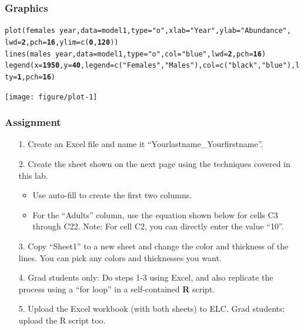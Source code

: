 \documentclass[color=usenames,dvipsnames]{beamer}\usepackage[]{graphicx}\usepackage[]{color}
\makeatletter
\newcommand{\hlnum}[1]{\textcolor[rgb]{0.502,0,0.502}{\textbf{#1}}}%
\newcommand{\hlstr}[1]{\textcolor[rgb]{0.651,0.522,0}{#1}}%
\newcommand{\hlopt}[1]{\textcolor[rgb]{1,0,0.502}{\textbf{#1}}}%
\newcommand{\hlstd}[1]{\textcolor[rgb]{0,0,0}{#1}}%
\newcommand{\hlkwc}[1]{\textcolor[rgb]{0,0.502,0.753}{#1}}%
\newcommand{\hlkwd}[1]{\textcolor[rgb]{0,0.267,0.4}{#1}}%
\newenvironment{kframe}{%
 \def\at@end@of@kframe{}%
 \ifinner\ifhmode%
  \def\at@end@of@kframe{\end{minipage}}%
  \begin{minipage}{\columnwidth}%
 \fi\fi%
 \def\FrameCommand##1{\hskip\@totalleftmargin \hskip-\fboxsep
 \colorbox{shadecolor}{##1}\hskip-\fboxsep
     \hskip-\linewidth \hskip-\@totalleftmargin \hskip\columnwidth}%
 \MakeFramed {\advance\hsize-\width
   \@totalleftmargin\z@ \linewidth\hsize
   \@setminipage}}%
 {\par\unskip\endMakeFramed%
 \at@end@of@kframe}
\newenvironment{knitrout}{}{} %
\makeatother
\begin{document}
\begin{frame}[fragile]
  \frametitle{Graphics}
\begin{knitrout}\tiny
{}\color{fgcolor}\begin{kframe}
\begin{alltt}
\hlkwd{plot}\hlstd{(females} \hlopt{~} \hlstd{year,} \hlkwc{data}\hlstd{=model1,} \hlkwc{type}\hlstd{=}\hlstr{"o"}\hlstd{,} \hlkwc{xlab}\hlstd{=}\hlstr{"Year"}\hlstd{,} \hlkwc{ylab}\hlstd{=}\hlstr{"Abundance"}\hlstd{,}
     \hlkwc{lwd}\hlstd{=}\hlnum{2}\hlstd{,} \hlkwc{pch}\hlstd{=}\hlnum{16}\hlstd{,} \hlkwc{ylim}\hlstd{=}\hlkwd{c}\hlstd{(}\hlnum{0}\hlstd{,} \hlnum{120}\hlstd{))}
\hlkwd{lines}\hlstd{(males} \hlopt{~} \hlstd{year,} \hlkwc{data}\hlstd{=model1,} \hlkwc{type}\hlstd{=}\hlstr{"o"}\hlstd{,} \hlkwc{col}\hlstd{=}\hlstr{"blue"}\hlstd{,} \hlkwc{lwd}\hlstd{=}\hlnum{2}\hlstd{,} \hlkwc{pch}\hlstd{=}\hlnum{16}\hlstd{)}
\hlkwd{legend}\hlstd{(}\hlkwc{x}\hlstd{=}\hlnum{1950}\hlstd{,} \hlkwc{y}\hlstd{=}\hlnum{40}\hlstd{,} \hlkwc{legend}\hlstd{=}\hlkwd{c}\hlstd{(}\hlstr{"Females"}\hlstd{,} \hlstr{"Males"}\hlstd{),} \hlkwc{col}\hlstd{=}\hlkwd{c}\hlstd{(}\hlstr{"black"}\hlstd{,} \hlstr{"blue"}\hlstd{),} \hlkwc{lty}\hlstd{=}\hlnum{1}\hlstd{,} \hlkwc{pch}\hlstd{=}\hlnum{16}\hlstd{)}
\end{alltt}
\end{kframe}
\texttt{[image: figure/plot-1]} 

\end{knitrout}
\end{frame}




\begin{frame}
  \frametitle{Assignment}
  \footnotesize
  \begin{enumerate}
    \item[1.] Create an Excel file and name it ``Yourlastname\_Yourfirstname''.
    \item[2.] Create the sheet shown on the next page using the techniques covered in this lab.
      \begin{itemize}
        \scriptsize
        \item Use auto-fill to create the first two columns.
        \item For the ``Adults'' column, use the equation shown below
          for cells C3 through C22. Note: For cell C2, you can directly
          enter the value ``10''.
      \end{itemize}
    \item[3.] Copy ``Sheet1'' to a new sheet and change the color and
      thickness of the lines. You can pick any colors and thicknesses you want.
    \item[4.] Grad students only: Do steps 1-3 using Excel, and also
      replicate the process using a ``for loop'' in a self-contained
      {\bf R} script.
    \item[5.] Upload the Excel workbook (with both sheets) to ELC. Grad students: upload the
      R script too.
  \end{enumerate}
\end{frame}
\end{document}
